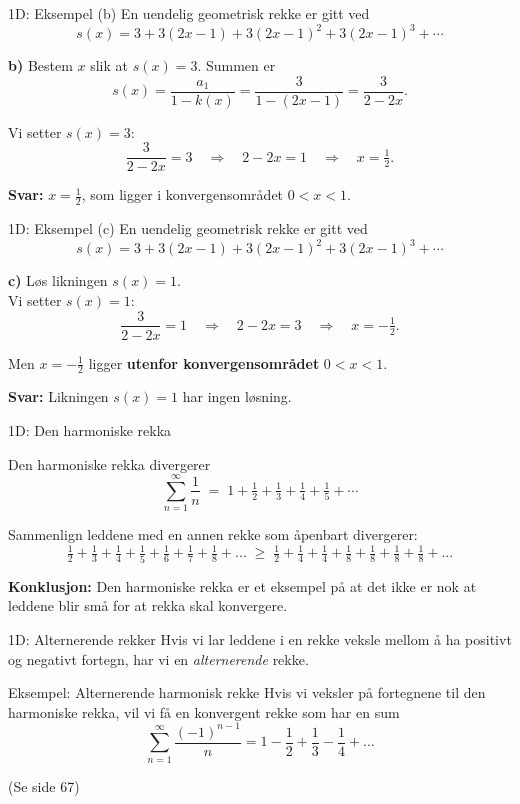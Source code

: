 \greenheader
\begin{frame}{1D: Eksempel (b)}
En uendelig geometrisk rekke er gitt ved
\[
s(x) = 3 + 3(2x-1) + 3(2x-1)^2 + 3(2x-1)^3 + \cdots
\]

\textbf{b)} Bestem $x$ slik at $s(x) = 3$.
Summen er
\[
s(x) =\frac{a_1}{1-k(x)}= \frac{3}{1-(2x-1)} = \frac{3}{2-2x}.
\]


Vi setter $s(x) = 3$:
\[
\frac{3}{2-2x} = 3 \quad \Longrightarrow \quad 2-2x = 1 \quad \Longrightarrow \quad x=\tfrac12.
\]

\textbf{Svar:} $x = \tfrac12$, som ligger i konvergensområdet $0<x<1$.
\end{frame}

\greenheader
\begin{frame}{1D: Eksempel (c)}
En uendelig geometrisk rekke er gitt ved
\[
s(x) = 3 + 3(2x-1) + 3(2x-1)^2 + 3(2x-1)^3 + \cdots
\]

\textbf{c)} Løs likningen $s(x) = 1$.\\

Vi setter $s(x) = 1$:
\[
\frac{3}{2-2x} = 1 \quad \Longrightarrow \quad 2-2x = 3 \quad \Longrightarrow \quad x = -\tfrac12.
\]

Men $x=-\tfrac12$ ligger \textbf{utenfor konvergensområdet} $0<x<1$.  

\medskip
\textbf{Svar:} Likningen $s(x)=1$ har ingen løsning.
\end{frame}

\blueheader
\begin{frame}{1D: Den harmoniske rekka}


Den harmoniske rekka divergerer
\[
\sum_{n=1}^{\infty} \frac{1}{n} \;=\; 1 + \tfrac{1}{2} + \tfrac{1}{3} + \tfrac{1}{4} + \tfrac{1}{5} + \cdots
\]

\medskip
Sammenlign leddene med en annen rekke som åpenbart divergerer:
  \[
  \tfrac{1}{2} + \tfrac{1}{3} + \tfrac{1}{4} +\tfrac{1}{5} +\tfrac{1}{6} +\tfrac{1}{7} +\tfrac{1}{8}+... \; \geq \; \tfrac{1}{2}+\tfrac{1}{4}+\tfrac{1}{4}+\tfrac{1}{8}+\tfrac{1}{8}+\tfrac{1}{8}+\tfrac{1}{8}+...
  \]

\medskip
\textbf{Konklusjon:} Den harmoniske rekka er et eksempel på at det ikke er nok at leddene blir små for at rekka skal konvergere.
\end{frame}

\blueheader
\begin{frame}{1D: Alternerende rekker}
Hvis vi lar leddene i en rekke veksle mellom å ha positivt og negativt fortegn, har vi en \emph{alternerende} rekke.

\begin{green*}{Eksempel: Alternerende harmonisk rekke}
    Hvis vi veksler på fortegnene til den harmoniske rekka, vil vi få en konvergent rekke som har en sum
    \[
    \sum_{n=1}^{\infty}\frac{(-1)^{n-1}}{n}=1-\frac{1}{2}+\frac{1}{3}-\frac{1}{4}+...
    \]

    \medskip
    (Se side 67)
\end{green*}
\end{frame}

